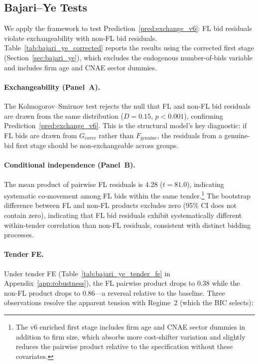 \subsection{Bajari--Ye Tests}
\label{sec:results_bajari}

We apply the \citet{bajari2003deciding} framework to test
Prediction~\ref{pred:exchange_v6}: FL bid residuals violate
exchangeability with non-FL bid residuals.
Table~\ref{tab:bajari_ye_corrected} reports the results using the %
corrected first stage (Section~\ref{sec:bajari_ye}), which excludes
the endogenous number-of-bids variable and includes firm age and CNAE
sector dummies.



\paragraph{Exchangeability (Panel~A).}
The Kolmogorov--Smirnov test rejects the null that FL and
non-FL bid residuals are drawn from the same distribution
($D = 0.15$, $p < 0.001$), confirming
Prediction~\ref{pred:exchange_v6}. This is the structural model's
key diagnostic: if FL bids are drawn from $G_{\text{cover}}$ rather
than $F_{\text{genuine}}$, the residuals from a genuine-bid first
stage should be non-exchangeable across groups.

\paragraph{Conditional independence (Panel~B).}
The mean product of pairwise FL residuals is 4.28 ($t = 81.0$), %
indicating systematic co-movement among FL bids within the same
tender.\footnote{The v6 enriched first stage includes firm age and
CNAE sector dummies in addition to firm size, which absorbs more
cost-shifter variation and slightly reduces the pairwise product
relative to the specification without these covariates.}
The bootstrap difference between FL and non-FL products excludes zero
(95\% CI does not contain zero), indicating that FL bid residuals
exhibit systematically different within-tender correlation than non-FL
residuals, consistent with distinct bidding processes.

\paragraph{Tender FE.} %
Under tender FE (Table~\ref{tab:bajari_ye_tender_fe} in
Appendix~\ref{app:robustness}), the FL pairwise product drops to
0.38 while the non-FL product drops to 0.86---a reversal relative to
the baseline. Three observations resolve the apparent tension with
Regime~2 (which the BIC selects):

